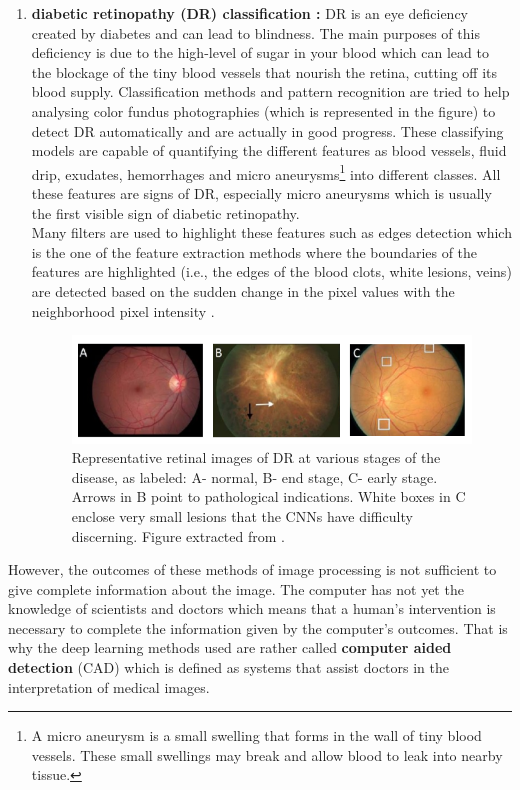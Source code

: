\documentclass[11pt, openany]{report}
\theoremstyle{plain}
\theoremstyle{definition}
\theoremstyle{remark}
\begin{document}
\begin{enumerate}
\newpage
\item \textbf{diabetic retinopathy (DR) classification :} DR is an eye deficiency created by diabetes and can lead to blindness. The main purposes of this deficiency is due to the high-level of sugar in your blood which can lead to the blockage of the tiny blood vessels that nourish the retina, cutting off its blood supply. Classification methods and pattern recognition are tried to help analysing color fundus photographies (which is represented in the figure) to detect DR automatically and are actually in good progress. These classifying models are capable of quantifying the different features as blood vessels, fluid drip, exudates, hemorrhages and micro aneurysms\footnote{A micro aneurysm is a small swelling that forms in the wall of tiny blood vessels. These small swellings may break and allow blood to leak into nearby tissue.} into different classes. All these features are signs of DR, especially micro aneurysms which is usually the first visible sign of diabetic retinopathy. \\
Many filters are used to highlight these features such as edges detection which is the one of the feature extraction methods where the boundaries of the features are highlighted (i.e., the edges of the blood clots, white lesions, veins) are detected based on the sudden change in the pixel values with the neighborhood pixel intensity \cite{DR-1}.

\begin{figure}[h]
  \centering
  \includegraphics[scale=0.6]{figures/DR-images-examples.png}
  \caption{Representative retinal images of DR at various stages of the disease, as labeled: A- normal, B- end stage, C- early stage. Arrows in B point to pathological indications. White boxes in C enclose very small lesions that the CNNs have difficulty discerning. Figure extracted from \cite{DR-2}.}
  \label{fig:DR-example}
\end{figure}

\end{enumerate}

However, the outcomes of these methods of image processing is not sufficient to give complete information about the image. The computer has not yet the knowledge of scientists and doctors which means that a human's intervention is necessary to complete the information given by the computer's outcomes. That is why the deep learning methods used are rather called \textbf{computer aided detection} (CAD) which is defined as systems that assist doctors in the interpretation of medical images. 
\end{document}
